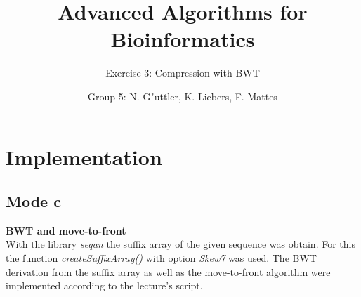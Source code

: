 \documentclass[11pt, notitlepage]{scrartcl}
\begin{document}
         


\title{Advanced Algorithms for Bioinformatics} 
\subtitle{Exercise 3: Compression with BWT}
\author{Group 5: N. G"uttler, K. Liebers, F. Mattes} %
\maketitle

\section{Implementation}

%
%
%	
%
%
\subsection{Mode c}




  
\textbf{BWT and move-to-front}\\
With the library \textit{seqan} the suffix array of the given sequence was obtain. For this the function \textit{createSuffixArray() }with option \textit{Skew7} was used. The BWT derivation from the suffix array as well as the move-to-front algorithm were implemented according to the lecture's script.
\end{document}
